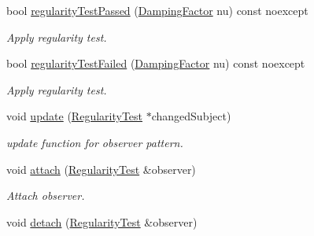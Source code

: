 \begin{DoxyCompactItemize}
\item 
bool \hyperlink{classSpacy_1_1Mixin_1_1RegularityTest_acb6b3e8c76ebdbded0ec610959513caf}{regularity\-Test\-Passed} (\hyperlink{classSpacy_1_1DampingFactor}{\-Damping\-Factor} nu) const noexcept
\begin{DoxyCompactList}\small\item\em \-Apply regularity test. \end{DoxyCompactList}\item 
bool \hyperlink{classSpacy_1_1Mixin_1_1RegularityTest_aeb1a3b051bafc9da9be1df354c652812}{regularity\-Test\-Failed} (\hyperlink{classSpacy_1_1DampingFactor}{\-Damping\-Factor} nu) const noexcept
\begin{DoxyCompactList}\small\item\em \-Apply regularity test. \end{DoxyCompactList}\item 
\hypertarget{classSpacy_1_1Mixin_1_1RegularityTest_a1a6191e20f84025cec8b10ec63ab94ac}{void \hyperlink{classSpacy_1_1Mixin_1_1RegularityTest_a1a6191e20f84025cec8b10ec63ab94ac}{update} (\hyperlink{classSpacy_1_1Mixin_1_1RegularityTest_a548d9d45c31c7833266bd3b20dc1aa7e}{\-Regularity\-Test} $\ast$changed\-Subject)}\label{classSpacy_1_1Mixin_1_1RegularityTest_a1a6191e20f84025cec8b10ec63ab94ac}

\begin{DoxyCompactList}\small\item\em update function for observer pattern. \end{DoxyCompactList}\item 
\hypertarget{classSpacy_1_1Mixin_1_1MixinConnection_abb5520ee6b22dd993d78f142939a1ed4}{void \hyperlink{classSpacy_1_1Mixin_1_1MixinConnection_abb5520ee6b22dd993d78f142939a1ed4}{attach} (\hyperlink{classSpacy_1_1Mixin_1_1RegularityTest_a548d9d45c31c7833266bd3b20dc1aa7e}{\-Regularity\-Test} \&observer)}\label{classSpacy_1_1Mixin_1_1MixinConnection_abb5520ee6b22dd993d78f142939a1ed4}

\begin{DoxyCompactList}\small\item\em \-Attach observer. \end{DoxyCompactList}\item 
\hypertarget{classSpacy_1_1Mixin_1_1MixinConnection_adda739590c487679c26f60e50aedb73f}{void \hyperlink{classSpacy_1_1Mixin_1_1MixinConnection_adda739590c487679c26f60e50aedb73f}{detach} (\hyperlink{classSpacy_1_1Mixin_1_1RegularityTest_a548d9d45c31c7833266bd3b20dc1aa7e}{\-Regularity\-Test} \&observer)}\label{classSpacy_1_1Mixin_1_1MixinConnection_adda739590c487679c26f60e50aedb73f}


\end{DoxyCompactItemize}
